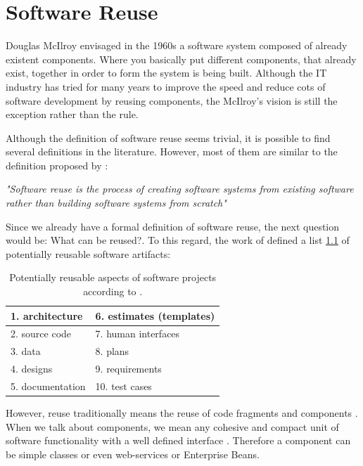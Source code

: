 \chapter{Software Reuse}
\label{chap:sw-reuse}

Douglas McIlroy \citep{McIlroy1968} envisaged in the 1960s a software system composed of already existent components. Where you basically put different components, that already exist, together in order to form the system is being built. Although the IT industry has tried for many years to improve the speed and reduce cots of software development by reusing components, the McIlroy's vision is still the exception rather than the rule.

Although the definition of software reuse seems trivial, it is possible to find several definitions in the literature. However, most of them are similar to the definition proposed by \cite{Krueger1992}:

\textit{"Software reuse is the process of creating software systems from existing software rather than building software systems from scratch"}

Since we already have a formal definition of software reuse, the next question would be: What can be reused?. To this regard, the work of \cite{Frakes1996} defined a list \ref{reusable-list} of potentially reusable software artifacts:

\begin{table}[]
\centering
\label{reusable-list}
	\begin{tabular}{|l|l|}
		\hline
		1. architecture						 & 6. estimates (templates) \\ \hline
		2. source code  						 & 7. human interfaces      \\ \hline
		3. data                               & 8. plans                 \\ \hline
		4. designs                            & 9. requirements          \\ \hline
		5. documentation                      & 10. test cases           \\ \hline
	\end{tabular}
	\caption{Potentially reusable aspects of software projects according to \cite{Frakes1996}.}
\end{table}

However, reuse traditionally means the reuse of code fragments and components \cite{Mili2002}. When we talk about components, we mean any cohesive and compact unit of software functionality with a well defined interface \citep{Hummel2008}. Therefore a component can be simple classes or even web-services or Enterprise Beans.

